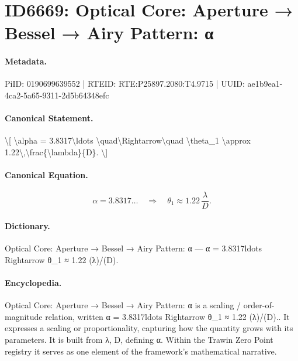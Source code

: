 \section*{ID6669: Optical Core: Aperture → Bessel → Airy Pattern: α}
\paragraph{Metadata.}
PiID: 0190699639552 | RTEID: RTE:P25897.2080:T4.9715 | UUID: ae1b9ea1-4ca2-5a65-9311-2d5b64348efc

\paragraph{Canonical Statement.}
\textbackslash{}[ \textbackslash{}alpha = 3.8317\textbackslash{}ldots \textbackslash{}quad\textbackslash{}Rightarrow\textbackslash{}quad \textbackslash{}theta\_1 \textbackslash{}approx 1.22\textbackslash{},\textbackslash{}frac\{\textbackslash{}lambda\}\{D\}. \textbackslash{}]

\paragraph{Canonical Equation.}
\[
\alpha = 3.8317\ldots \quad\Rightarrow\quad \theta_1 \approx 1.22\,\frac{\lambda}{D}.
\]

\paragraph{Dictionary.}
Optical Core: Aperture → Bessel → Airy Pattern: α — α = 3.8317ldots Rightarrow θ\_1 ≈ 1.22 (λ)/(D).

\paragraph{Encyclopedia.}
Optical Core: Aperture → Bessel → Airy Pattern: α is a scaling / order-of-magnitude relation, written α = 3.8317ldots Rightarrow θ\_1 ≈ 1.22 (λ)/(D).. It expresses a scaling or proportionality, capturing how the quantity grows with its parameters. It is built from λ, D, defining α. Within the Trawin Zero Point registry it serves as one element of the framework's mathematical narrative.
